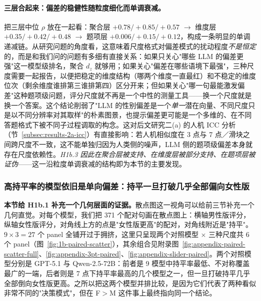 \documentclass[UTF8,12pt]{ctexart}
\begin{document}
\paragraph{三层合起来：偏差的稳健性随粒度细化而单调衰减。}
把三层中位 $\rho$ 放在一起看：聚合层 $+0.78 / +0.85 / +0.57$ $\to$ 维度层 $+0.35 / +0.42 / +0.48$ $\to$ 题项层 $+0.006 / +0.15 / +0.12$，构成一条明显的单调递减链。从研究问题的角度看，这意味着尺度格式对偏差模式的扰动程度\emph{不是恒定}的，而是和我们问的问题有多细有直接关系：如果只关心"哪些 LLM 的偏差更强"这一模型级排名，聚合 $d_z$ 就够用；如果关心"偏差在哪些语境下最强"，三种尺度需要一起报告，以便把稳定的维度结构（哪两个维度一直最红）和不稳定的维度位次（剩余维度谁排第三谁排第四）区分开来；但如果关心"哪一句最能激发偏差"这种题项级问题，评分尺度就不再是一个中性的测量工具——换一个尺度就是换一个答案。这个结论削弱了"LLM 的性别偏差是一个\emph{单一}潜在向量、不同尺度只是以不同分辨率对其取样"的朴素图景，也提示偏差更可能是一个多维的、在不同答题格式下被不同子过程调取的构念。这对后文研究二(a) 的人机 ICC 分析（节~\ref{subsec:results-2a-icc}）有直接影响：若人机相似度在 3 点与 7 点／滑块之间跨尺度不一致，这不能单独归因为人类侧的噪声，LLM 侧的题项级偏差本身就存在尺度依赖性。\emph{H1b.3 因此在聚合层被支持、在维度层被部分支持、在题项层被证伪}——这一沿粒度单调衰减的结构即为本节的主要发现。

\subsubsection{高持平率的模型依旧是单向偏差：持平一旦打破几乎全部偏向女性版}
\label{subsubsec:1b-tie-asymmetry}
\label{subsubsec:1b-paired-scatter}

\textbf{本节给 H1b.1 补充一个几何层面的证据。}散点图这一视角可以给前三节补充一个几何直觉。对每个模型，我们把 371 个配对句画在散点图上：横轴男性版评分，纵轴女性版评分，对角线上方的点是"女性版更高"的配对，对角线附近是"持平"。$9 \times 3 = 27$ 个 panel 全铺开过于拥挤，这里只呈现两个对照模型 $\times$ 三种尺度共 6 个 panel（图~\ref{fig:1b-paired-scatter}），其余组合见附录图~\ref{fig:appendix-paired-scatter-full}、\ref{fig:appendix-3pt-paired}、\ref{fig:appendix-slider-paired}。两个对照模型分别是 GPT-5.1 与 Qwen-2.5-72B：前者是 9 模型中持平率最低、不对称覆盖最广的一端，后者则是 7 点下持平率最高的几个模型之一，但一旦打破持平几乎全部倒向女性版更高。之所以把这两个模型并排比较，是因为它们代表了两种看似非常不同的"决策模式"，但在 F$>$M 这件事上最终指向同一个结论。
\end{document}

